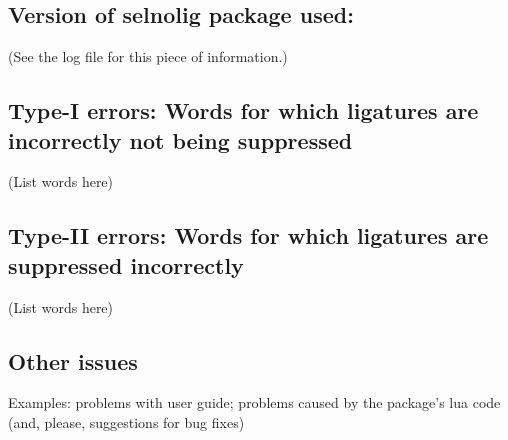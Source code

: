 \documentclass{article}
\begin{document}
\subsection*{Version of selnolig package used:}

(See the log file for this piece of information.)

\subsection*{Type-I errors: Words for which ligatures are incorrectly not being suppressed}

(List words here)

\subsection*{Type-II errors: Words for which ligatures are suppressed incorrectly}

(List words here)

\subsection*{Other issues}

Examples: problems with user guide; problems caused by the package's lua code 
(and, please, suggestions for bug fixes)
\end{document}
